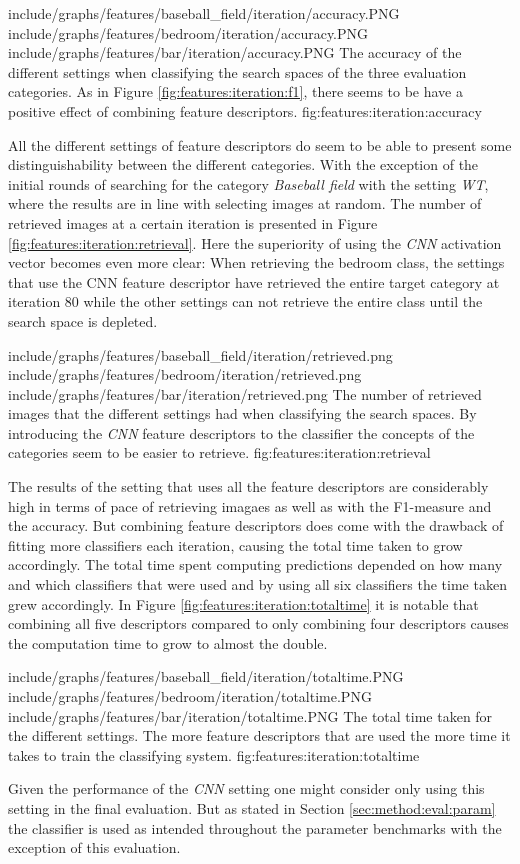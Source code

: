 \tripfigurenear
{include/graphs/features/baseball_field/iteration/accuracy.PNG}
{include/graphs/features/bedroom/iteration/accuracy.PNG}
{include/graphs/features/bar/iteration/accuracy.PNG}
{The accuracy of the different settings when classifying the search spaces of the three evaluation categories. As in Figure \ref{fig:features:iteration:f1}, there seems to be have a positive effect of combining feature descriptors.}
{fig:features:iteration:accuracy}


All the different settings of feature descriptors do seem to be able to present some distinguishability between the different categories. With the exception of the initial rounds of searching for the category \emph{Baseball field} with the setting \emph{WT}, where the results are in line with selecting images at random. The number of retrieved images at a certain iteration is presented in Figure \ref{fig:features:iteration:retrieval}. Here the superiority of using the \emph{CNN} activation vector becomes even more clear: When retrieving the bedroom class, the settings that use the CNN feature descriptor have retrieved the entire target category at iteration 80 while the other settings can not retrieve the entire class until the search space is depleted. 

\tripfigurenear
{include/graphs/features/baseball_field/iteration/retrieved.png}
{include/graphs/features/bedroom/iteration/retrieved.png}
{include/graphs/features/bar/iteration/retrieved.png}
{The number of retrieved images that the different settings had when classifying the search spaces. By introducing the \emph{CNN} feature descriptors to the classifier the concepts of the categories seem to be easier to retrieve.}
{fig:features:iteration:retrieval}


The results of the setting that uses all the feature descriptors are considerably high in terms of pace of retrieving imagaes as well as with the F1-measure and the accuracy. But combining feature descriptors does come with the drawback of fitting more classifiers each iteration, causing the total time taken to grow accordingly.
The total time spent computing predictions depended on how many and which classifiers that were used and by using all six classifiers the time taken grew accordingly. In Figure \ref{fig:features:iteration:totaltime} it is notable that combining all five descriptors compared to only combining four descriptors causes the computation time to grow to almost the double. 

\tripfigure
{include/graphs/features/baseball_field/iteration/totaltime.PNG}
{include/graphs/features/bedroom/iteration/totaltime.PNG}
{include/graphs/features/bar/iteration/totaltime.PNG}
{The total time taken for the different settings. The more feature descriptors that are used the more time it takes to train the classifying system.}
{fig:features:iteration:totaltime}

Given the performance of the \emph{CNN} setting one might consider only using this setting in the final evaluation. But as stated in Section \ref{sec:method:eval:param} the classifier is used as intended throughout the parameter benchmarks with the exception of this evaluation. 

